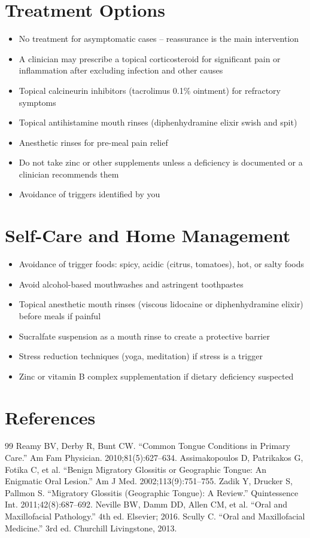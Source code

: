 \section*{Treatment Options}
\begin{itemize}
  \item No treatment for asymptomatic cases -- reassurance is the main intervention
  \item A clinician may prescribe a topical corticosteroid for significant pain or inflammation after excluding infection and other causes
  \item Topical calcineurin inhibitors (tacrolimus 0.1\% ointment) for refractory symptoms
  \item Topical antihistamine mouth rinses (diphenhydramine elixir swish and spit)
  \item Anesthetic rinses for pre-meal pain relief
  \item Do not take zinc or other supplements unless a deficiency is documented or a clinician recommends them
  \item Avoidance of triggers identified by you
\end{itemize}

\section*{Self-Care and Home Management}
\begin{itemize}
  \item Avoidance of trigger foods: spicy, acidic (citrus, tomatoes), hot, or salty foods
  \item Avoid alcohol-based mouthwashes and astringent toothpastes
  \item Topical anesthetic mouth rinses (viscous lidocaine or diphenhydramine elixir) before meals if painful
  \item Sucralfate suspension as a mouth rinse to create a protective barrier
  \item Stress reduction techniques (yoga, meditation) if stress is a trigger
  \item Zinc or vitamin B complex supplementation if dietary deficiency suspected
\end{itemize}

\section*{References}
\begin{thebibliography}{99}
 Reamy BV, Derby R, Bunt CW. ``Common Tongue Conditions in Primary Care.'' Am Fam Physician. 2010;81(5):627--634.
 Assimakopoulos D, Patrikakos G, Fotika C, et al. ``Benign Migratory Glossitis or Geographic Tongue: An Enigmatic Oral Lesion.'' Am J Med. 2002;113(9):751--755.
 Zadik Y, Drucker S, Pallmon S. ``Migratory Glossitis (Geographic Tongue): A Review.'' Quintessence Int. 2011;42(8):687--692.
 Neville BW, Damm DD, Allen CM, et al. ``Oral and Maxillofacial Pathology.'' 4th ed. Elsevier; 2016.
 Scully C. ``Oral and Maxillofacial Medicine.'' 3rd ed. Churchill Livingstone, 2013.
\end{thebibliography}
